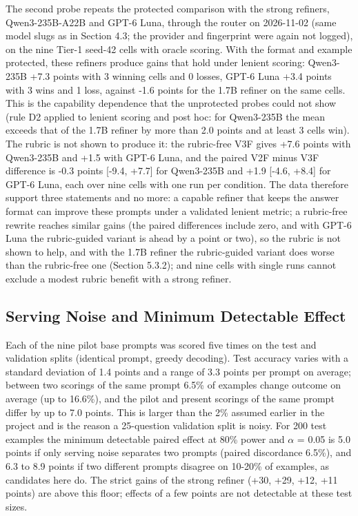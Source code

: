 \documentclass{ieeeaccess}
\begin{document}
The second probe repeats the protected comparison with the strong refiners, Qwen3-235B-A22B and GPT-6 Luna, through the router on 2026-11-02 (same model slugs as in Section 4.3; the provider and fingerprint were again not logged), on the nine Tier-1 seed-42 cells with oracle scoring. With the format and example protected, these refiners produce gains that hold under lenient scoring: Qwen3-235B +7.3 points with 3 winning cells and 0 losses, GPT-6 Luna +3.4 points with 3 wins and 1 loss, against -1.6 points for the 1.7B refiner on the same cells. This is the capability dependence that the unprotected probes could not show (rule D2 applied to lenient scoring and post hoc: for Qwen3-235B the mean exceeds that of the 1.7B refiner by more than 2.0 points and at least 3 cells win). The rubric is not shown to produce it: the rubric-free V3F gives +7.6 points with Qwen3-235B and +1.5 with GPT-6 Luna, and the paired V2F minus V3F difference is -0.3 points [-9.4, +7.7] for Qwen3-235B and +1.9 [-4.6, +8.4] for GPT-6 Luna, each over nine cells with one run per condition. The data therefore support three statements and no more: a capable refiner that keeps the answer format can improve these prompts under a validated lenient metric; a rubric-free rewrite reaches similar gains (the paired differences include zero, and with GPT-6 Luna the rubric-guided variant is ahead by a point or two), so the rubric is not shown to help, and with the 1.7B refiner the rubric-guided variant does worse than the rubric-free one (Section 5.3.2); and nine cells with single runs cannot exclude a modest rubric benefit with a strong refiner.

\subsection{Serving Noise and Minimum Detectable Effect}

Each of the nine pilot base prompts was scored five times on the test and validation splits (identical prompt, greedy decoding). Test accuracy varies with a standard deviation of 1.4 points and a range of 3.3 points per prompt on average; between two scorings of the same prompt 6.5\% of examples change outcome on average (up to 16.6\%), and the pilot and present scorings of the same prompt differ by up to 7.0 points. This is larger than the 2\% assumed earlier in the project and is the reason a 25-question validation split is noisy. For 200 test examples the minimum detectable paired effect at 80\% power and $\alpha$ = 0.05 is 5.0 points if only serving noise separates two prompts (paired discordance 6.5\%), and 6.3 to 8.9 points if two different prompts disagree on 10-20\% of examples, as candidates here do. The strict gains of the strong refiner (+30, +29, +12, +11 points) are above this floor; effects of a few points are not detectable at these test sizes.
\end{document}
